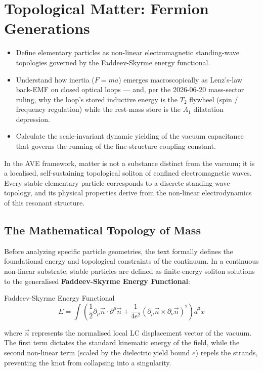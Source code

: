 \chapter{Topological Matter: Fermion Generations}
\label{ch:topological_matter}

\begin{objectivebox}
\begin{itemize}
    \item Define elementary particles as non-linear electromagnetic standing-wave topologies governed by the Faddeev-Skyrme energy functional.
    \item Understand how inertia ($F = ma$) emerges macroscopically as Lenz's-law back-EMF on closed optical loops --- and, per the 2026-06-20 mass-sector ruling, why the loop's stored inductive energy is the $T_2$ flywheel (spin / frequency regulation) while the rest-mass store is the $A_1$ dilatation depression.
    \item Calculate the scale-invariant dynamic yielding of the vacuum capacitance that governs the running of the fine-structure coupling constant.
\end{itemize}
\end{objectivebox}

In the AVE framework, matter is not a substance distinct from the vacuum; it is a localised, self-sustaining topological soliton of confined electromagnetic waves. Every stable elementary particle corresponds to a discrete standing-wave topology, and its physical properties derive from the non-linear electrodynamics of this resonant structure.

\section{The Mathematical Topology of Mass}
Before analyzing specific particle geometries, the text formally defines the foundational energy and topological constraints of the continuum. In a continuous non-linear substrate, stable particles are defined as finite-energy soliton solutions to the generalised \textbf{Faddeev-Skyrme Energy Functional}:
\begin{resultbox}{Faddeev-Skyrme Energy Functional}
\begin{equation}
    E = \int \left( \frac{1}{2}\partial_\mu \vec{n} \cdot \partial^\mu \vec{n} + \frac{1}{4e^2}(\partial_\mu \vec{n} \times \partial_\nu \vec{n})^2 \right) d^3x
\end{equation}
\end{resultbox}
where $\vec{n}$ represents the normalised local LC displacement vector of the vacuum. The first term dictates the standard kinematic energy of the field, while the second non-linear term (scaled by the dielectric yield bound $e$) repels the strands, preventing the knot from collapsing into a singularity.


